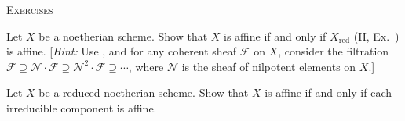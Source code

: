 {\medskip
\noindent\textsc{Exercises}\par\nobreak\smallskip
{\fontsize{9.2}{10.65}\selectfont\leftskip=20pt
\noindent\hypertarget{ex-III-3.1}{}Let $X$ be a noetherian scheme. Show that $X$ is affine if and only if $X_{\mathrm{red}}$ (II, Ex.~) is affine. [\emph{Hint:} Use , and for any coherent sheaf $\mathcal F$ on $X$, consider the filtration $\mathcal F\supseteq\mathcal N\cdot\mathcal F\supseteq\mathcal N^2\cdot\mathcal F\supseteq\cdots$, where $\mathcal N$ is the sheaf of nilpotent elements on $X$.]

\smallskip
\noindent\hypertarget{ex-III-3.2}{}Let $X$ be a reduced noetherian scheme. Show that $X$ is affine if and only if each irreducible component is affine.\par}
}
